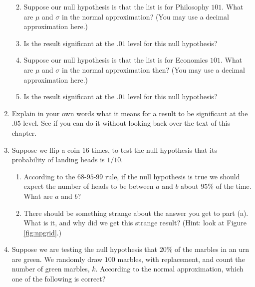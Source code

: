 \documentclass[justified]{tufte-book}
\providecommand{\tightlist}{%
  \setlength{\itemsep}{0pt}\setlength{\parskip}{0pt}}
\theoremstyle{definition}
\theoremstyle{definition}
\theoremstyle{definition}
\theoremstyle{definition}
\theoremstyle{remark}
\begin{document}
\begin{enumerate}
  \begin{enumerate}
  \def\labelenumii{\alph{enumii}.}
  \tightlist
  \item
    Suppose our null hypothesis is that the list is for Philosophy \(101\). What are \(\mu\) and \(\sigma\) in the normal approximation? (You may use a decimal approximation here.)
  \item
    Is the result significant at the \(.01\) level for this null hypothesis?
  \item
    Suppose our null hypothesis is that the list is for Economics \(101\). What are \(\mu\) and \(\sigma\) in the normal approximation then? (You may use a decimal approximation here.)
  \item
    Is the result significant at the \(.01\) level for this null hypothesis?
  \end{enumerate}
\item
  Explain in your own words what it means for a result to be significant at the \(.05\) level. See if you can do it without looking back over the text of this chapter.
\item
  Suppose we flip a coin \(16\) times, to test the null hypothesis that its probability of landing heads is \(1/10\).

  \begin{enumerate}
  \def\labelenumii{\alph{enumii}.}
  \tightlist
  \item
    According to the \(68\)-\(95\)-\(99\) rule, if the null hypothesis is true we should expect the number of heads to be between \(a\) and \(b\) about \(95\%\) of the time. What are \(a\) and \(b\)?
  \item
    There should be something strange about the answer you get to part (a). What is it, and why did we get this strange result? (Hint: look at Figure \ref{fig:npgrid}.)
  \end{enumerate}
\item
  Suppose we are testing the null hypothesis that \(20\%\) of the marbles in an urn are green. We randomly draw \(100\) marbles, with replacement, and count the number of green marbles, \(k\). According to the normal approximation, which one of the following is correct?


\end{enumerate}
\end{document}
